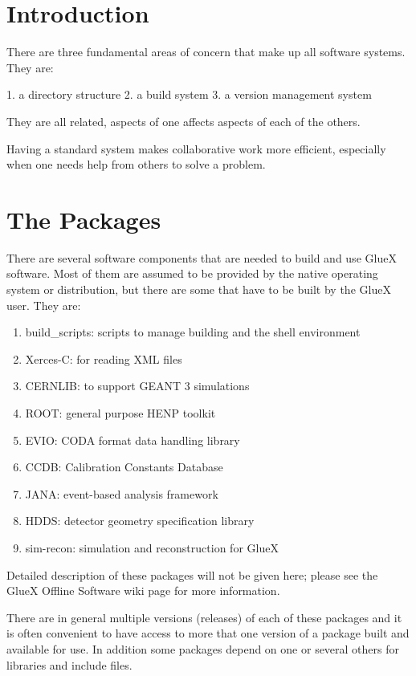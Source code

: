\documentclass{article}
\begin{document}
\section{Introduction}
There are three fundamental areas of concern that make up all software systems. They are:

1. a directory structure
2. a build system
3. a version management system

They are all related, aspects of one affects aspects of each of the others.

Having a standard system makes collaborative work more efficient, especially when one needs help from others to solve a problem.

\section{The Packages}

There are several software components that are needed to build and use GlueX software. Most of them are assumed to be provided by the native operating system or distribution, but there are some that have to be built by the GlueX user. They are:

\begin{enumerate}
\item build\_scripts: scripts to manage building and the shell environment
\item Xerces-C: for reading XML files
\item CERNLIB: to support GEANT 3 simulations
\item ROOT: general purpose HENP toolkit
\item EVIO: CODA format data handling library
\item CCDB: Calibration Constants Database
\item JANA: event-based analysis framework
\item HDDS: detector geometry specification library 
\item sim-recon: simulation and reconstruction for GlueX
\end{enumerate}

Detailed description of these packages will not be given here; please see the GlueX Offline Software wiki page for more information.

There are in general multiple versions (releases) of each of these packages and it is often convenient to have access to more that one version of a package built and available for use. In addition some packages depend on one or several others for libraries and include files.
\end{document}
